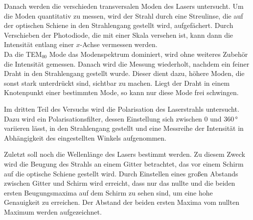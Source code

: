Danach werden die verschieden transversalen Moden des Lasers untersucht. Um die Moden quantitativ zu messen, wird der Strahl durch eine Streulinse, die auf der optischen Schiene in den Strahlengang gestellt wird, aufgefächert. Durch Verschieben der Photodiode, die mit einer Skala versehen ist, kann dann die Intensität entlang einer $x$-Achse vermessen werden. \\
Da die TEM$_{\mathrm{00}}$ Mode das Modenspektrum dominiert, wird ohne weiteres Zubehör die Intensität gemessen. Danach wird die Messung wiederholt, nachdem ein feiner Draht in den Strahlengang gestellt wurde. Dieser dient dazu, höhere Moden, die sonst stark unterdrückt sind, sichtbar zu machen. Liegt der Draht in einem Knotenpunkt einer bestimmten Mode, so kann nur diese Mode frei schwingen.

Im dritten Teil des Versuchs wird die Polarisation des Laserstrahls untersucht. Dazu wird ein Polarisationsfilter, dessen Einstellung sich zwischen 0 und 360$\,°$ variieren lässt, in den Strahlengang gestellt und eine Messreihe der Intensität in Abhängigkeit des eingestellten Winkels aufgenommen.

Zuletzt soll noch die Wellenlänge des Lasers bestimmt werden. Zu diesem Zweck wird die Beugung des Strahls an einem Gitter betrachtet, das vor einem Schirm auf die optische Schiene gestellt wird. Durch Einstellen eines großen Abstands zwischen Gitter und Schirm wird erreicht, dass nur das nullte und die beiden ersten Beugungsmaxima auf dem Schirm zu sehen sind, um eine hohe Genauigkeit zu erreichen. Der Abstand der beiden ersten Maxima vom nullten Maximum werden aufgezeichnet.

